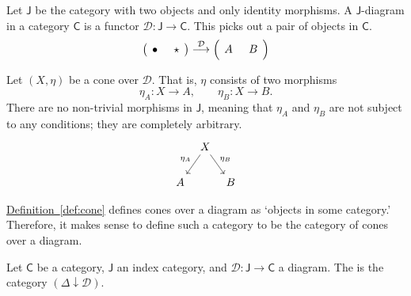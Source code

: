 \documentclass[main.tex]{subfiles}
\begin{document}
\begin{example}
  \label{eg:cone_over_category_with_two_objects_no_morphisms}
  Let $\mathsf{J}$ be the category with two objects and only identity morphisms. A $\mathsf{J}$-diagram in a category $\mathsf{C}$ is a functor $\mathcal{D}\colon \mathsf{J} \to \mathsf{C}$. This picks out a pair of objects in $\mathsf{C}$.
  \begin{equation*}
    \left( \begin{tikzcd}[column sep=tiny]
      \bullet
      & \star
    \end{tikzcd} \right)
    \overset{\mathcal{D}}{\longrightarrow}
    \left( \begin{tikzcd}[column sep=tiny]
      A
      & B
    \end{tikzcd} \right)
  \end{equation*}

  Let $(X, \eta)$ be a cone over $\mathcal{D}$. That is, $\eta$ consists of two morphisms 
  \begin{equation*}
    \eta_{A}\colon X \to A,\qquad \eta_{B}\colon X \to B.
  \end{equation*}
  There are no non-trivial morphisms in $\mathsf{J}$, meaning that $\eta_{A}$ and $\eta_{B}$ are not subject to any conditions; they are completely arbitrary.
  \begin{equation*}
    \begin{tikzcd}[column sep=tiny]
      & X
      \arrow[dl, swap, "\eta_{A}"]
      \arrow[dr, "\eta_{B}"]
      \\
      A
      && B
    \end{tikzcd}
  \end{equation*}
\end{example}

\hyperref[def:cone]{Definition~\ref*{def:cone}} defines cones over a diagram as `objects in some category.' Therefore, it makes sense to define such a category to be the category of cones over a diagram.

\begin{definition}
  \label{def:categoryofconesoveradiagram}
  Let $\mathsf{C}$ be a category, $\mathsf{J}$ an index category, and $\mathcal{D}\colon \mathsf{J} \rightarrow \mathsf{C}$ a diagram. The  is the category $(\Delta \downarrow \mathcal{D})$.
\end{definition}
\end{document}
